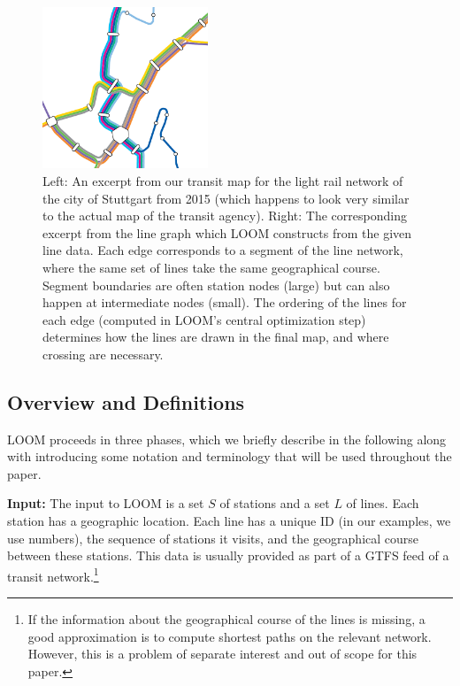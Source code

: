\documentclass{llncs}
\begin{document}
\begin{figure}[t]
  \centering
  \includegraphics[trim={0cm 0 2.47cm 4.07cm},clip,width=0.44\textwidth]{render_examples/vvs_cropped.pdf}
  \hspace{1.0cm}
	
	\caption{Left: An excerpt from our transit map for the light rail network of the city of Stuttgart from 2015 (which happens to look very similar to the actual map of the transit agency). Right: The corresponding excerpt from the line graph which LOOM constructs from the given line data. Each edge corresponds to a segment of the line network, where the same set of lines take the same geographical course. Segment boundaries are often station nodes (large) but can also happen at intermediate nodes (small). The ordering of the lines for each edge (computed in LOOM's central optimization step) determines how the lines are drawn in the final map, and where crossing are necessary.}
  \vspace{0mm}
	\label{FIG:transitgraphvvs}
\end{figure}


\def\Hl{\ell}
\subsection{Overview and Definitions}\label{SEC:intro:definition}

LOOM proceeds in three phases, which we briefly describe in the following along with introducing some notation and terminology that will be used throughout the paper.

\smallskip\noindent
{\bf Input:}
The input to LOOM is a set $S$ of stations and a set $L$ of lines.
Each station has a geographic location.
Each line has a unique ID (in our examples, we use numbers), the sequence of stations it visits, and the geographical course between these stations.
This data is usually provided as part of a GTFS feed of a transit network.\footnote{If the information about the geographical course of the lines is missing, a good approximation is to compute shortest paths on the relevant network. However, this is a problem of separate interest and out of scope for this paper.}
\end{document}
